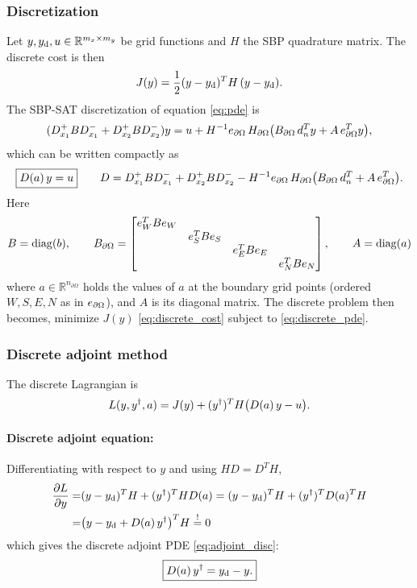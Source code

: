 \subsubsection{Discretization}
Let $y,y_{\mathrm{d}},u\in\mathbb{R}^{m_x \times m_y}$ be grid functions and $H$ the SBP quadrature matrix.
The discrete cost is then
\begin{equation}
J(y)=\frac12 (y-y_{\mathrm{d}})^T H\,(y-y_{\mathrm{d}}).
\label{eq:discrete_cost}
\end{equation}
The SBP-SAT discretization of equation \eqref{eq:pde} is
\begin{equation}
(D_{x_1}^{+}BD_{x_1}^{-}+D_{x_2}^{+}BD_{x_2}^{-})y
=u+H^{-1}e_{\partial\Omega}\,H_{\partial\Omega}\big(B_{\partial\Omega}\, d_n^{T}y+A\,e_{\partial\Omega}^{T}y\big),
\end{equation}
which can be written compactly as
\begin{equation}
\boxed{D(a)\,y=u}\qquad
D=D_{x_1}^{+}BD_{x_1}^{-}+D_{x_2}^{+}BD_{x_2}^{-}-H^{-1}e_{\partial\Omega}\,H_{\partial\Omega}\big(B_{\partial\Omega}\, d_n^{T}+A\,e_{\partial\Omega}^{T}\big).
\label{eq:discrete_pde}
\end{equation}
Here
\begin{equation}
B=\operatorname{diag}(b),\qquad
B_{\partial\Omega}=\begin{bmatrix}
e_W^TBe_W & & &\\
& e_S^TBe_S & &\\
& & e_E^TBe_E &\\
& & & e_N^TBe_N
\end{bmatrix},\qquad
A=\operatorname{diag}(a)
\end{equation}
where $a\in\mathbb{R}^{n_{\partial\Omega}}$ holds the values of $a$ at the boundary
grid points (ordered $W,S,E,N$ as in $e_{\partial\Omega}$), and $A$ is its diagonal matrix. The discrete problem then becomes, minimize $J(y)$ \eqref{eq:discrete_cost} subject to \eqref{eq:discrete_pde}.

\subsubsection{Discrete adjoint method}
The discrete Lagrangian is
\begin{equation}
L(y,y^{\dagger},a)=J(y)+(y^{\dagger})^TH\big(D(a)\,y-u\big).
\end{equation}

\paragraph{Discrete adjoint equation:}
Differentiating with respect to $y$ and using
$HD=D^TH$,
\begin{align*}
\frac{\partial L}{\partial y}
= & (y-y_{\mathrm{d}})^TH+(y^{\dagger})^TH D(a)
=(y-y_{\mathrm{d}})^TH+(y^{\dagger})^TD(a)^TH \\
= & \big(y-y_{\mathrm{d}}+D(a)\,y^{\dagger}\big)^TH \overset{!}{=}0
\end{align*}
which gives the discrete adjoint PDE \eqref{eq:adjoint_disc}:
\begin{equation}
\boxed{D(a)\,y^{\dagger}=y_{\mathrm{d}}-y.}
\label{eq:adjoint_disc}
\end{equation}

